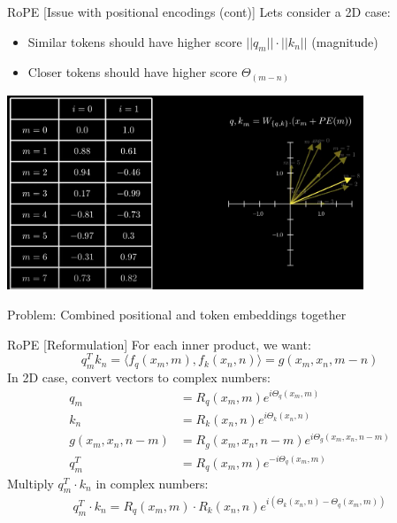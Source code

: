 \documentclass{beamer}
\begin{document}
\begin{frame}[t]{RoPE [Issue with positional encodings (cont)]}
    Lets consider a 2D case:
    \begin{itemize}[label=-]
        \item Similar tokens should have higher score $||q_m|| \cdot ||k_n||$ (magnitude) 
        \item Closer tokens should have higher score $\Theta_{(m-n)}$
    \end{itemize}
    \begin{center}
        \includegraphics[width=0.8\textwidth]{./img/rope_2.png}
    \end{center}
    Problem: Combined positional and token embeddings together
\end{frame}

\begin{frame}[t]{RoPE [Reformulation]}
    For each inner product, we want: \[q_m^T k_n = \langle f_q(x_m, m), f_k(x_n, n) \rangle = g(x_m, x_n, m - n)\]
    In 2D case, convert vectors to complex numbers:
    \begin{align}
        q_m &= R_q(x_m, m)e^{i \Theta_q(x_m,m)} \\
        k_n &= R_k(x_n, n)e^{i \Theta_k(x_n,n)} \\
        g(x_m, x_n, n - m) &= R_g(x_m, x_n, n - m) e^{i \Theta_g(x_m, x_n, n - m)}\\
        q_m^T &= R_q(x_m, m)e^{-i \Theta_q(x_m,m)}
    \end{align}
    Multiply $q_m^T \cdot k_n$ in complex numbers:
    \begin{align}
        q_m^T \cdot k_n = R_q(x_m, m) \cdot R_k(x_n, n) e^{i (\Theta_k(x_n,n) - \Theta_q(x_m,m))}
    \end{align}
\end{frame}
\end{document}

